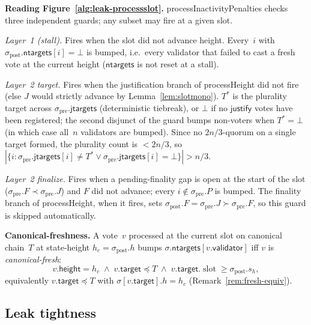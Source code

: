 \ifx\litemode\undefined\documentclass{article}\fi
\newcommand{\slot}[0]{\ensuremath{\operatorname{\mathrm{slot}}}}
\newcommand{\target}{\mathsf{target}}
\newcommand{\height}{\mathsf{height}}
\newcommand{\validator}{\mathsf{validator}}
\newcommand{\just}{\ensuremath{\mathsf{justify}}\xspace}
\newcommand{\jtargets}{\mathsf{jtargets}}
\newcommand{\ntargets}{\mathsf{ntargets}}
\newcommand{\processHeight}{\textsf{processHeight}\xspace}
\newcommand{\processInactivityPenalties}{\textsf{processInactivityPenalties}\xspace}
\renewcommand{\paragraph}[1]{\vspace{7pt}\noindent\textbf{#1}}
\theoremstyle{plain}
\theoremstyle{definition}
\theoremstyle{remark}
\begin{document}
\paragraph{Reading Figure~\ref{alg:leak-processslot}.}
\processInactivityPenalties checks three independent guards; any subset may fire at a given slot.

\emph{Layer~1 (stall).} Fires when the slot did not advance height.
Every~$i$ with $\sigma_{\mathrm{post}}.\ntargets[i] = \bot$ is bumped, i.e.\ every validator that failed to cast a fresh vote at the current height ($\ntargets$ is not reset at a stall).

\emph{Layer~2 target.} Fires when the justification branch of \processHeight did not fire (else $J$ would strictly advance by Lemma~\ref{lem:slotmono}).
$T^*$ is the plurality target across $\sigma_{\mathrm{pre}}.\jtargets$ (deterministic tiebreak), or $\bot$ if no \just votes have been registered; the second disjunct of the guard bumps non-voters when $T^* = \bot$ (in which case all~$n$ validators are bumped).
Since no $2n/3$-quorum on a single target formed, the plurality count is $< 2n/3$, so $|\{i : \sigma_{\mathrm{pre}}.\jtargets[i] \neq T^* \vee \sigma_{\mathrm{pre}}.\jtargets[i] = \bot\}| > n/3$.

\emph{Layer~2 finalize.} Fires when a pending-finality gap is open at the start of the slot ($\sigma_{\mathrm{pre}}.F \prec \sigma_{\mathrm{pre}}.J$) and $F$ did not advance; every $i \notin \sigma_{\mathrm{pre}}.P$ is bumped.
The finality branch of \processHeight, when it fires, sets $\sigma_{\mathrm{post}}.F = \sigma_{\mathrm{pre}}.J \succ \sigma_{\mathrm{pre}}.F$, so this guard is skipped automatically.

\paragraph{Canonical-freshness.}
A vote~$v$ processed at the current slot on canonical chain~$T$ at state-height $h_c = \sigma_{\mathrm{post}}.h$ bumps $\sigma.\ntargets[v.\validator]$ iff $v$ is \emph{canonical-fresh}:
\[
  v.\height = h_c \;\wedge\; v.\target \preceq T \;\wedge\; v.\target.\slot \geq \sigma_{\mathrm{post}}.s_h,
\]
equivalently $v.\target \preceq T$ with $\sigma[v.\target].h = h_c$ (Remark~\ref{rem:fresh-equiv}).

\subsection{Leak tightness}
\end{document}
